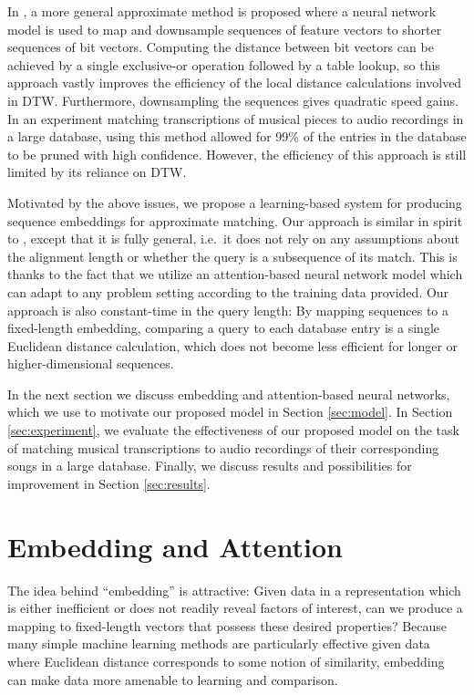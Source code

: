 \documentclass{article}
\begin{document}
In \cite{raffel2015large}, a more general approximate method is proposed where a neural network model is used to map and downsample sequences of feature vectors to shorter sequences of bit vectors.
Computing the distance between bit vectors can be achieved by a single exclusive-or operation followed by a table lookup, so this approach vastly improves the efficiency of the local distance calculations involved in DTW.
Furthermore, downsampling the sequences gives quadratic speed gains.
In an experiment matching transcriptions of musical pieces to audio recordings in a large database, using this method allowed for 99\% of the entries in the database to be pruned with high confidence.
However, the efficiency of this approach is still limited by its reliance on DTW.

Motivated by the above issues, we propose a learning-based system for producing sequence embeddings for approximate matching.
Our approach is similar in spirit to \cite{papapetrou2011embedding}, except that it is fully general, i.e.\ it does not rely on any assumptions about the alignment length or whether the query is a subsequence of its match.
This is thanks to the fact that we utilize an attention-based neural network model which can adapt to any problem setting according to the training data provided.
Our approach is also constant-time in the query length: By mapping sequences to a fixed-length embedding, comparing a query to each database entry is a single Euclidean distance calculation, which does not become less efficient for longer or higher-dimensional sequences.

In the next section we discuss embedding and attention-based neural networks, which we use to motivate our proposed model in Section \ref{sec:model}.
In Section \ref{sec:experiment}, we evaluate the effectiveness of our proposed model on the task of matching musical transcriptions to audio recordings of their corresponding songs in a large database.
Finally, we discuss results and possibilities for improvement in Section \ref{sec:results}.

\section{Embedding and Attention}
\label{sec:embedding}

The idea behind ``embedding'' is attractive: Given data in a representation which is either inefficient or does not readily reveal factors of interest, can we produce a mapping to fixed-length vectors that possess
these desired properties?
Because many simple machine learning methods are particularly effective given data where Euclidean distance corresponds to some notion of similarity, embedding can make data more amenable to learning and comparison.
\end{document}
